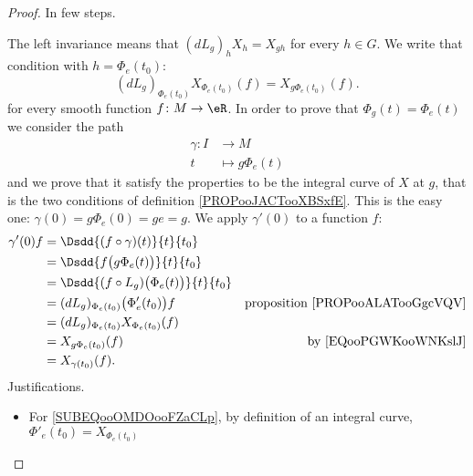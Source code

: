\begin{proof}
    In few steps.
    \begin{subproof}
         
        The left invariance means that $(dL_g)_hX_h=X_{gh}$ for every \( h\in G\). We write that condition with \( h=\Phi_e(t_0)\):
        \begin{equation}        \label{EQooPGWKooWNKslJ}
            (dL_g)_{\Phi_e(t_0)}X_{\Phi_e(t_0)}(f)=X_{g\Phi_e(t_0)}(f).
        \end{equation}
        for every smooth function \( f\colon M\to \eR\).
        In order to prove that \( \Phi_g(t)=\Phi_e(t)\) we consider the path
        \begin{equation}
            \begin{aligned}
                \gamma\colon I&\to M \\
                t&\mapsto g\Phi_e(t) 
            \end{aligned}
        \end{equation}
        and we prove that it satisfy the properties to be the integral curve of \( X\) at \( g\), that is the two conditions of definition \ref{PROPooJACTooXBSxfE}.
        This is the easy one: \( \gamma(0)=g\Phi_e(0)=ge=g\).
        We apply \( \gamma'(0)\) to a function \( f\):
        \begin{subequations}
            \begin{align}
                \gamma'(0)f&=\Dsdd{ (f\circ \gamma)(t) }{t}{t_0}\\
                &=\Dsdd{ f\big( g\Phi_e(t) \big) }{t}{t_0}\\
                &=\Dsdd{ (f\circ L_g)\big( \Phi_e(t) \big) }{t}{t_0}\\
                &=(dL_g)_{\Phi_e(t_0)}\big( \Phi_e'(t_0) \big)f     &\text{proposition \ref{PROPooALATooGgcVQV}}\\
                &=(dL_g)_{\Phi_e(t_0)}X_{\Phi_e(t_0)}(f)        \label{SUBEQooOMDOooFZaCLp}\\
                &=X_{g\Phi_e(t_0)}(f)       &\text{by \eqref{EQooPGWKooWNKslJ}}\\
                &=X_{\gamma(t_0)}(f).
            \end{align}
        \end{subequations}
        Justifications.
        \begin{itemize}
            \item For \eqref{SUBEQooOMDOooFZaCLp}, by definition of an integral curve, \( \Phi'_e(t_0)=X_{\Phi_e(t_0)}\)
        \end{itemize}
    \end{subproof}
\end{proof}

